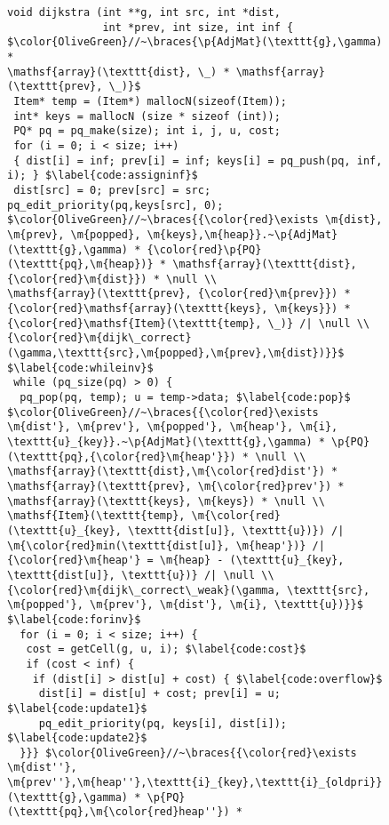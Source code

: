 
\begin{figure}[t]

\begin{lstlisting}[mathescape=true,showlines=true]
void dijkstra (int **g, int src, int *dist, 
               int *prev, int size, int inf {
$\color{OliveGreen}//~\braces{\p{AdjMat}(\texttt{g},\gamma) *
\mathsf{array}(\texttt{dist}, \_) * \mathsf{array}(\texttt{prev}, \_)}$
 Item* temp = (Item*) mallocN(sizeof(Item));
 int* keys = mallocN (size * sizeof (int));
 PQ* pq = pq_make(size); int i, j, u, cost;
 for (i = 0; i < size; i++) 
 { dist[i] = inf; prev[i] = inf; keys[i] = pq_push(pq, inf, i); } $\label{code:assigninf}$
 dist[src] = 0; prev[src] = src; pq_edit_priority(pq,keys[src], 0);
$\color{OliveGreen}//~\braces{{\color{red}\exists \m{dist}, \m{prev}, \m{popped}, \m{keys},\m{heap}}.~\p{AdjMat}(\texttt{g},\gamma) * {\color{red}\p{PQ}(\texttt{pq},\m{heap})} * \mathsf{array}(\texttt{dist},{\color{red}\m{dist}}) * \null \\
\mathsf{array}(\texttt{prev}, {\color{red}\m{prev}}) * 
{\color{red}\mathsf{array}(\texttt{keys}, \m{keys}}) * 
{\color{red}\mathsf{Item}(\texttt{temp}, \_)} /| \null \\
{\color{red}\m{dijk\_correct}(\gamma,\texttt{src},\m{popped},\m{prev},\m{dist})}}$ $\label{code:whileinv}$
 while (pq_size(pq) > 0) {
  pq_pop(pq, temp); u = temp->data; $\label{code:pop}$
$\color{OliveGreen}//~\braces{{\color{red}\exists \m{dist'}, \m{prev'}, \m{popped'}, \m{heap'}, \m{i}, \texttt{u}_{key}}.~\p{AdjMat}(\texttt{g},\gamma) * \p{PQ}(\texttt{pq},{\color{red}\m{heap'}}) * \null \\
\mathsf{array}(\texttt{dist},\m{\color{red}dist'}) * 
\mathsf{array}(\texttt{prev}, \m{\color{red}prev'}) * 
\mathsf{array}(\texttt{keys}, \m{keys}) * \null \\
\mathsf{Item}(\texttt{temp}, \m{\color{red}(\texttt{u}_{key}, \texttt{dist[u]}, \texttt{u})}) /| 
\m{\color{red}min(\texttt{dist[u]}, \m{heap'})} /| 
{\color{red}\m{heap'} = \m{heap} - (\texttt{u}_{key}, \texttt{dist[u]}, \texttt{u})} /| \null \\
{\color{red}\m{dijk\_correct\_weak}(\gamma, \texttt{src}, \m{popped'}, \m{prev'}, \m{dist'}, \m{i}, \texttt{u})}}$ $\label{code:forinv}$
  for (i = 0; i < size; i++) {
   cost = getCell(g, u, i); $\label{code:cost}$
   if (cost < inf) {
    if (dist[i] > dist[u] + cost) { $\label{code:overflow}$
     dist[i] = dist[u] + cost; prev[i] = u; $\label{code:update1}$ 
     pq_edit_priority(pq, keys[i], dist[i]); $\label{code:update2}$
  }}} $\color{OliveGreen}//~\braces{{\color{red}\exists \m{dist''}, \m{prev''},\m{heap''},\texttt{i}_{key},\texttt{i}_{oldpri}}.~\p{AdjMat}(\texttt{g},\gamma) * \p{PQ}(\texttt{pq},\m{\color{red}heap''}) *

\end{lstlisting}
\end{figure}
